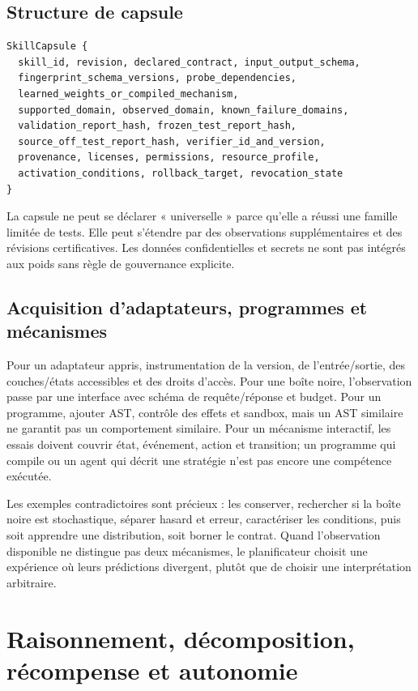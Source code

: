 \documentclass[11pt,a4paper]{report}
\begin{document}
\section{Structure de capsule}
\begin{lstlisting}
SkillCapsule {
  skill_id, revision, declared_contract, input_output_schema,
  fingerprint_schema_versions, probe_dependencies,
  learned_weights_or_compiled_mechanism,
  supported_domain, observed_domain, known_failure_domains,
  validation_report_hash, frozen_test_report_hash,
  source_off_test_report_hash, verifier_id_and_version,
  provenance, licenses, permissions, resource_profile,
  activation_conditions, rollback_target, revocation_state
}
\end{lstlisting}
La capsule ne peut se déclarer « universelle » parce qu'elle a réussi une famille limitée de tests. Elle peut s'étendre par des observations supplémentaires et des révisions certificatives. Les données confidentielles et secrets ne sont pas intégrés aux poids sans règle de gouvernance explicite.

\section{Acquisition d'adaptateurs, programmes et mécanismes}
Pour un adaptateur appris, instrumentation de la version, de l'entrée/sortie, des couches/états accessibles et des droits d'accès. Pour une boîte noire, l'observation passe par une interface avec schéma de requête/réponse et budget. Pour un programme, ajouter AST, contrôle des effets et sandbox, mais un AST similaire ne garantit pas un comportement similaire. Pour un mécanisme interactif, les essais doivent couvrir état, événement, action et transition; un programme qui compile ou un agent qui décrit une stratégie n'est pas encore une compétence exécutée.

Les exemples contradictoires sont précieux : les conserver, rechercher si la boîte noire est stochastique, séparer hasard et erreur, caractériser les conditions, puis soit apprendre une distribution, soit borner le contrat. Quand l'observation disponible ne distingue pas deux mécanismes, le planificateur choisit une expérience où leurs prédictions divergent, plutôt que de choisir une interprétation arbitraire.

\chapter{Raisonnement, décomposition, récompense et autonomie}
\end{document}
